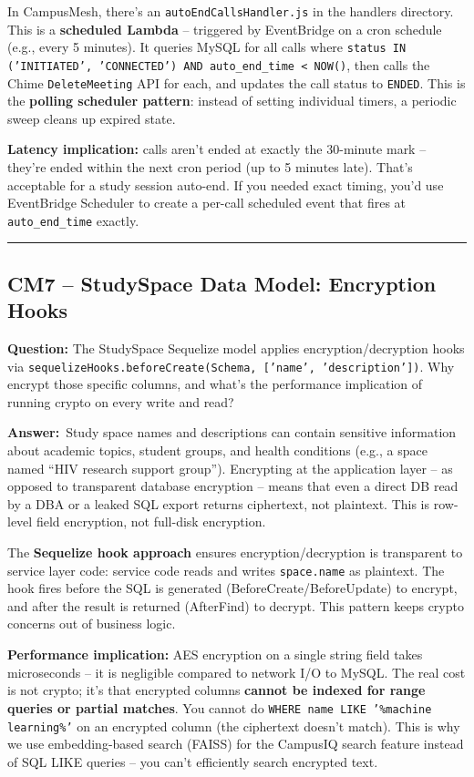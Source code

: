 \documentclass[letterpaper,10pt]{article}
\newlength{\boxwidth}
\newcommand{\questionbox}[1]{%
  \vspace{6pt}%
  \noindent\colorbox{qbg}{%
    \begin{minipage}{\boxwidth}%
      \vspace{3pt}\textbf{\textcolor{nordblue}{Question:}} #1\vspace{3pt}%
    \end{minipage}%
  }\vspace{2pt}%
}
\newcommand{\answerlabel}{\noindent\textbf{\textcolor{answerblue}{Answer:}}~}
\begin{document}
In CampusMesh, there's an \texttt{autoEndCallsHandler.js} in the handlers directory. This is a \textbf{scheduled Lambda} -- triggered by EventBridge on a cron schedule (e.g., every 5 minutes). It queries MySQL for all calls where \texttt{status IN ('INITIATED', 'CONNECTED') AND auto\_end\_time \textless{} NOW()}, then calls the Chime \texttt{DeleteMeeting} API for each, and updates the call status to \texttt{ENDED}. This is the \textbf{polling scheduler pattern}: instead of setting individual timers, a periodic sweep cleans up expired state.

\textbf{Latency implication:} calls aren't ended at exactly the 30-minute mark -- they're ended within the next cron period (up to 5 minutes late). That's acceptable for a study session auto-end. If you needed exact timing, you'd use EventBridge Scheduler to create a per-call scheduled event that fires at \texttt{auto\_end\_time} exactly.

\medskip\rule{\linewidth}{0.2pt}

\subsection*{CM7 -- StudySpace Data Model: Encryption Hooks}

\questionbox{The StudySpace Sequelize model applies encryption/decryption hooks via \texttt{sequelizeHooks.beforeCreate(Schema, ['name', 'description'])}. Why encrypt those specific columns, and what's the performance implication of running crypto on every write and read?}

\answerlabel Study space names and descriptions can contain sensitive information about academic topics, student groups, and health conditions (e.g., a space named ``HIV research support group''). Encrypting at the application layer -- as opposed to transparent database encryption -- means that even a direct DB read by a DBA or a leaked SQL export returns ciphertext, not plaintext. This is row-level field encryption, not full-disk encryption.

The \textbf{Sequelize hook approach} ensures encryption/decryption is transparent to service layer code: service code reads and writes \texttt{space.name} as plaintext. The hook fires before the SQL is generated (BeforeCreate/BeforeUpdate) to encrypt, and after the result is returned (AfterFind) to decrypt. This pattern keeps crypto concerns out of business logic.

\textbf{Performance implication:} AES encryption on a single string field takes microseconds -- it is negligible compared to network I/O to MySQL. The real cost is not crypto; it's that encrypted columns \textbf{cannot be indexed for range queries or partial matches}. You cannot do \texttt{WHERE name LIKE '\%machine learning\%'} on an encrypted column (the ciphertext doesn't match). This is why we use embedding-based search (FAISS) for the CampusIQ search feature instead of SQL LIKE queries -- you can't efficiently search encrypted text.
\end{document}
